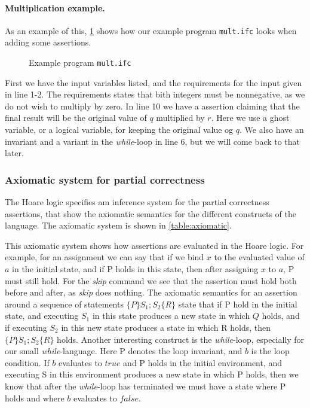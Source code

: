 \paragraph{Multiplication example.}
As an example of this, \cref{figure:mult} shows how our example program \texttt{mult.ifc} looks when adding some assertions.
\begin{figure}

\caption{Example program \texttt{mult.ifc}}
\label{figure:mult}
\end{figure}

First we have the input variables listed, and the requirements for the input given in line 1-2. The requirements states that bith integers must be nonnegative, as we do not wish to multiply by zero.
In line 10 we have a assertion claiming that the final result will be the original value of $q$ multiplied by $r$. Here we use a ghost variable, or a logical variable, for keeping the original value og $q$.
We also have an invariant and a variant in the \textit{while}-loop in line 6, but we will come back to that later.


\subsubsection{Axiomatic system for partial correctness}
The Hoare logic specifies am inference system for the partial correctness assertions, that show the axiomatic semantics for the different constructs of the language. The axiomatic system is shown in \cref{table:axiomatic}.

This axiomatic system shows how assertions are evaluated in the Hoare logic. For example, for an assignment we can say that if we bind $x$ to the evaluated value of $a$ in the initial state, and if P holds in this state, then after assigning $x$ to $a$, P must still hold.
For the \textit{skip} command we see that the assertion must hold both before and after, as \textit{skip} does nothing.
The axiomatic semantics for an assertion around a sequence of statements $\{P\} S_1;S_2\{R\}$ state that if P hold in the initial state, and executing $S_1$ in this state produces a new state in which $Q$ holds, and if executing $S_2$ in this new state produces a state in which R holds, then $\{P\} S_1;S_2 \{R\}$ holds.
Another interesting construct is the \textit{while}-loop, especially for our small \textit{while}-language.
Here P denotes the loop invariant, and $b$ is the loop condition. If $b$ evaluates to $true$ and P holds in the initial environment, and executing S in this environment produces a new state in which P holds, then we know that after the \textit{while}-loop has terminated we must have a state where P holds and where $b$ evaluates to $false$.

